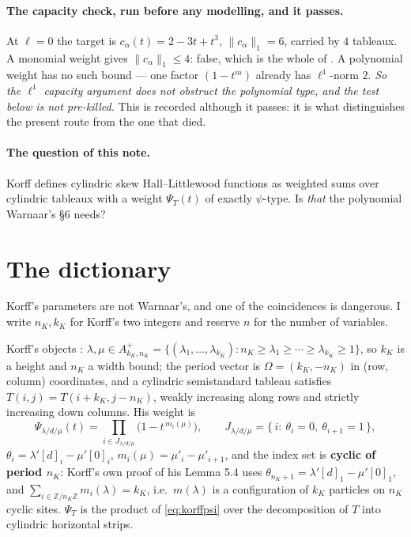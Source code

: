 \documentclass[11pt]{article}
\theoremstyle{definition}
\newcommand{\la}{\lambda}
\newcommand{\Z}{\mathbb{Z}}
\begin{document}
\paragraph{The capacity check, run before any modelling, and it passes.} At
$\ell=0$ the target is $c_\alpha(t)=2-3t+t^3$, $\|c_\alpha\|_1=6$, carried by
$4$ tableaux. A monomial weight gives $\|c_\alpha\|_1\le4$: false, which is the
whole of \cite[Lem.~2]{Cq405}. A polynomial weight has no such bound --- one
factor $(1-t^m)$ already has $\ell^1$-norm $2$. \emph{So the $\ell^1$ capacity
argument does not obstruct the polynomial type, and the test below is not
pre-killed.} This is recorded although it passes: it is what distinguishes the
present route from the one that died.

\paragraph{The question of this note.} Korff \cite[Def.~5.5]{K} defines
cylindric skew Hall--Littlewood functions as weighted sums over cylindric
tableaux with a weight $\Psi_T(t)$ of exactly $\psi$-type. Is \emph{that} the
polynomial Warnaar's \S6 needs?

\section{The dictionary}\label{sec:dict}

Korff's parameters are not Warnaar's, and one of the coincidences is dangerous.
I write $n_K,k_K$ for Korff's two integers and reserve $n$ for the number of
variables.

Korff's objects \cite[\S5.2]{K}: $\la,\mu\in A^+_{k_K,n_K}=
\{(\la_1,\dots,\la_{k_K}): n_K\ge\la_1\ge\cdots\ge\la_{k_K}\ge1\}$, so $k_K$
is a height and $n_K$ a width bound; the period vector is
$\Omega=(k_K,-n_K)$ in (row, column) coordinates, and a cylindric
semistandard tableau satisfies $T(i,j)=T(i+k_K,j-n_K)$, weakly increasing along
rows and strictly increasing down columns. His weight \cite[(5.13)]{K} is
\begin{equation}\label{eq:korffpsi}
 \Psi_{\la/d/\mu}(t)=\prod_{i\in J_{\la/d/\mu}}\bigl(1-t^{\,m_i(\mu)}\bigr),
 \qquad
 J_{\la/d/\mu}=\{\,i:\ \theta_i=0,\ \theta_{i+1}=1\,\},
\end{equation}
$\theta_i=\la'[d]_i-\mu'[0]_i$, $m_i(\mu)=\mu'_i-\mu'_{i+1}$, and the index
set is \textbf{cyclic of period $n_K$}: Korff's own proof of his Lemma 5.4 uses
$\theta_{n_K+1}=\la'[d]_1-\mu'[0]_1$, and
$\sum_{i\in\Z/n_K\Z}m_i(\la)=k_K$, i.e.\ $m(\la)$ is a configuration of $k_K$
particles on $n_K$ cyclic sites. $\Psi_T$ is the product of \eqref{eq:korffpsi}
over the decomposition of $T$ into cylindric horizontal strips.
\end{document}
